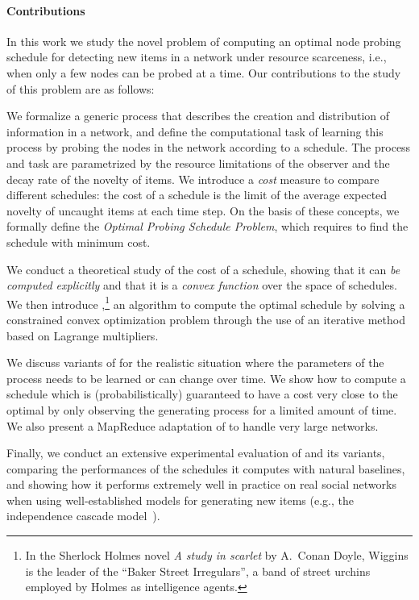 \paragraph*{Contributions}
In this work we study the novel problem of computing an optimal node probing
schedule for detecting new items in a network under resource scarceness, i.e.,
when only a few nodes can be probed at a time. Our contributions to the study of
this problem are as follows:

\begin{itemize*}
	\item We formalize a generic process that describes the creation and
		distribution of information in a network, and define the computational task of
		learning this process by probing the nodes in the network according to a
		schedule. The process and task are parametrized by the resource
		limitations of the observer and the decay rate of the novelty of
		items. We introduce a \emph{cost} measure to compare different
		schedules: the cost of a schedule is the limit of the average expected
		novelty of uncaught items at each time step. On the basis of
		these concepts,  we formally define the \emph{Optimal Probing Schedule
		Problem}, which requires to find the schedule with minimum cost.
	\item We conduct a theoretical study of the cost of a schedule, showing that
		it can \emph{be computed explicitly} and that it is a \emph{convex
		function} over the space of schedules. We then introduce
		\algoname,\footnote{In the Sherlock Holmes novel \emph{A study in
		scarlet} by A.~Conan Doyle, Wiggins is the leader of the ``Baker Street
		Irregulars'', a band of street urchins employed by Holmes as
		intelligence agents.} an algorithm to compute the optimal schedule by
		solving a constrained convex optimization problem through the use of an
		iterative method based on Lagrange multipliers.
	\item We discuss variants of \algoname for the realistic situation where
		the parameters of the process needs to be learned or can change over
		time. We show how to compute a schedule which is (probabilistically)
		guaranteed to have a cost very close to the optimal by only observing
		the generating process for a limited amount of time. We also present a
		MapReduce adaptation of \algoname to handle very large networks.
	\item Finally, we conduct an extensive experimental evaluation of \algoname
		and its variants, comparing the performances of the schedules it
		computes with natural baselines, and showing how it performs extremely
		well in practice on real social networks when using well-established
		models for generating new items (e.g., the independence cascade
		model~\citep{Kempe2003}).
\end{itemize*}

